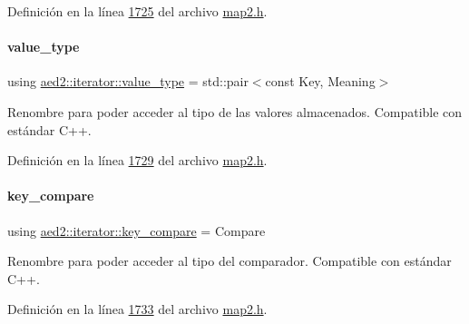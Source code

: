 Definición en la línea \hyperlink{map2_8h_source_l01725}{1725} del archivo \hyperlink{map2_8h_source}{map2.\+h}.

\mbox{\label{classaed2_1_1iterator_a6411a2c08b2b7c52f063bef1a168acb6_a6411a2c08b2b7c52f063bef1a168acb6}} 
\paragraph{\texorpdfstring{value\+\_\+type}{value\_type}}
{\footnotesize\ttfamily using \hyperlink{classaed2_1_1iterator_a6411a2c08b2b7c52f063bef1a168acb6_a6411a2c08b2b7c52f063bef1a168acb6}{aed2\+::iterator\+::value\+\_\+type} =  std\+::pair$<$const Key, Meaning$>$}



Renombre para poder acceder al tipo de las valores almacenados. Compatible con estándar C++. 



Definición en la línea \hyperlink{map2_8h_source_l01729}{1729} del archivo \hyperlink{map2_8h_source}{map2.\+h}.

\mbox{\label{classaed2_1_1iterator_a958d31cebad5df42b144eb6da2d44764_a958d31cebad5df42b144eb6da2d44764}} 
\paragraph{\texorpdfstring{key\+\_\+compare}{key\_compare}}
{\footnotesize\ttfamily using \hyperlink{classaed2_1_1iterator_a958d31cebad5df42b144eb6da2d44764_a958d31cebad5df42b144eb6da2d44764}{aed2\+::iterator\+::key\+\_\+compare} =  Compare}



Renombre para poder acceder al tipo del comparador. Compatible con estándar C++. 



Definición en la línea \hyperlink{map2_8h_source_l01733}{1733} del archivo \hyperlink{map2_8h_source}{map2.\+h}.

\mbox{\label{classaed2_1_1iterator_ad4ba975de35932c0cc8af3c25a6748bf_ad4ba975de35932c0cc8af3c25a6748bf}} 
